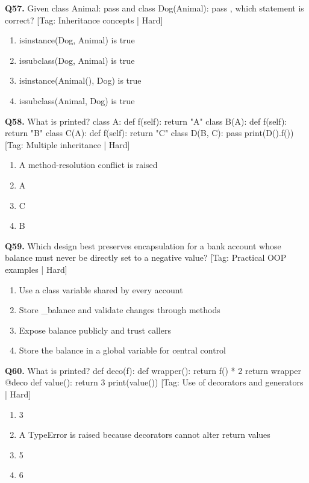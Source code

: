 \vspace{2mm}
\noindent\textbf{Q57.} Given class Animal: pass and class Dog(Animal): pass , which statement is correct? \hfill [Tag: Inheritance concepts | Hard]
\begin{enumerate}[label=(\alph*),topsep=2pt,itemsep=1pt,partopsep=0pt,parsep=0pt]
    \item {isinstance(Dog, Animal) is true}
    \item {issubclass(Dog, Animal) is true}
    \item {isinstance(Animal(), Dog) is true}
    \item {issubclass(Animal, Dog) is true}
\end{enumerate}
\vspace{2mm}
\noindent\textbf{Q58.} What is printed? class A: def f(self): return "A" class B(A): def f(self): return "B" class C(A): def f(self): return "C" class D(B, C): pass print(D().f()) \hfill [Tag: Multiple inheritance | Hard]
\begin{enumerate}[label=(\alph*),topsep=2pt,itemsep=1pt,partopsep=0pt,parsep=0pt]
    \item {A method-resolution conflict is raised}
    \item {A}
    \item {C}
    \item {B}
\end{enumerate}
\vspace{2mm}
\noindent\textbf{Q59.} Which design best preserves encapsulation for a bank account whose balance must never be directly set to a negative value? \hfill [Tag: Practical OOP examples | Hard]
\begin{enumerate}[label=(\alph*),topsep=2pt,itemsep=1pt,partopsep=0pt,parsep=0pt]
    \item {Use a class variable shared by every account}
    \item {Store \_balance and validate changes through methods}
    \item {Expose balance publicly and trust callers}
    \item {Store the balance in a global variable for central control}
\end{enumerate}
\vspace{2mm}
\noindent\textbf{Q60.} What is printed? def deco(f): def wrapper(): return f() * 2 return wrapper @deco def value(): return 3 print(value()) \hfill [Tag: Use of decorators and generators | Hard]
\begin{enumerate}[label=(\alph*),topsep=2pt,itemsep=1pt,partopsep=0pt,parsep=0pt]
    \item {3}
    \item {A TypeError is raised because decorators cannot alter return values}
    \item {5}
    \item {6}
\end{enumerate}
\vspace{2mm}

